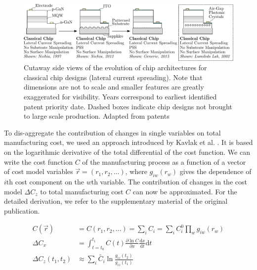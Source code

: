 \documentclass[a4paper,nocompress]{spie}  %
\begin{document}
        \begin{figure} [ht]
            \begin{center}
                \includegraphics[width=\textwidth]{SPIE/article/chip_architectures.pdf}
            \end{center}
            \caption{Cutaway side views of the evolution of chip architectures for classical chip designs (lateral current spreading). Note that dimensions are not to scale and smaller features are greatly exaggerated for visibility. Years correspond to earliest identified patent priority date. Dashed boxes indicate chip designs not brought to large scale production. Adapted from patents \cite{nagahama2013nitride,tanaka2010semiconductor,wierer2006photonic}}
            \label{fig:chip_arch}
        \end{figure}

        To dis-aggregate the contribution of changes in single variables on total manufacturing cost, we used an approach introduced by Kavlak et al. \cite{kavlak2018evaluating}. It is based on the logarithmic derivative of the total differential of the cost function. We can write the cost function $C$ of the manufacturing process as a function of a vector of cost model variables $\vec{r}=(r_1,r_2,\dots)$, where $g_{iw}(r_w)$ gives the dependence of $i$th cost component on the $w$th variable. The contribution of changes in the cost model $\Delta C_z$ to total manufacturing cost $C$ can now be approximated. For the detailed derivation, we refer to the supplementary material of the original publication.
    
    	\begin{align}
            C(\vec{r}) &= C(r_1,r_2, \dots) = \sum_i C_i = \sum_i C_i^0 \prod_w g_{iw}(r_w) \\
            \Delta C_x &= \int_{t=t_0}^{t_1} C(t) \frac{ \partial \ln C }{ \partial x } \frac{ \text{d} x }{ \text{d} t} \text{d} t \\
            \Delta C_z (t_1,t_2) &\approx \sum_i \tilde{C_i} \ln \frac{g_{iz}(t_2)}{g_{iz}(t_1)}
        \end{align}
    
\end{document}

